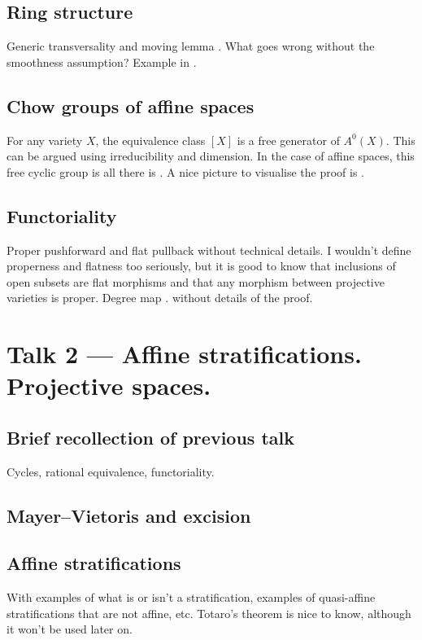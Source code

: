 \documentclass[A4paper, 12pt, british, reqno]{amsart}
\theoremstyle{plain}
\theoremstyle{definition}
\theoremstyle{remark}
\theoremstyle{plain}
\theoremstyle{definition}
\theoremstyle{remark}
\theoremstyle{plain}
\theoremstyle{definition}
\theoremstyle{remark}
\begin{document}
\subsection{Ring structure \cite[Thm.~1.5]{eh16}}
Generic transversality and moving lemma \cite[Thm.~1.6]{eh16}.
What goes wrong without the smoothness assumption?
Example in \cite[p.~20]{eh16}.

\subsection{Chow groups of affine spaces}
For any variety $X$, the equivalence class $[X]$ is a free generator of $A^{0}(X)$.
This can be argued using irreducibility and dimension.
In the case of affine spaces, this free cyclic group is all there is \cite[Prop.~1.13]{eh16}.
A nice picture to visualise the proof is \cite[Fig.~1.7]{eh16}.

\subsection{Functoriality \cite[\S 1.3.6]{eh16}}
Proper pushforward and flat pullback without technical details.
I wouldn't define properness and flatness too seriously, but it is good to know that inclusions of open subsets are flat morphisms and that any morphism between projective varieties is proper.
Degree map \cite[Prop.~1.21]{eh16}.
\cite[Thm.~1.23]{eh16} without details of the proof.

\section{Talk 2 --- Affine stratifications. Projective spaces.}

\subsection{Brief recollection of previous talk} Cycles, rational equivalence, functoriality.

\subsection{Mayer--Vietoris and excision \cite[\S 1.3.4]{eh16}}

\subsection{Affine stratifications \cite[\S 1.3.5]{eh16}}
With examples of what is or isn't a stratification, examples of quasi-affine stratifications that are not affine, etc.
Totaro's theorem \cite[Thm.~1.18]{eh16} is nice to know, although it won't be used later on.
\end{document}
